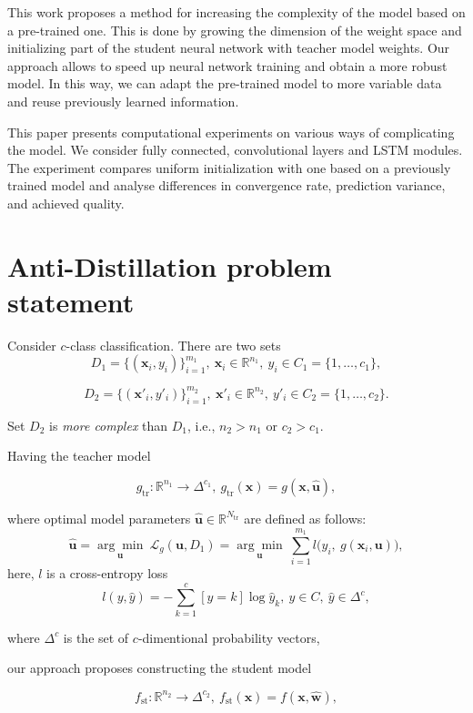 \documentclass[80pt]{article}
\begin{document}
This work proposes a method for increasing the complexity of the model based on a pre-trained one. This is done by growing the dimension of the weight space and initializing part of the student neural network with teacher model weights. Our approach allows to speed up neural network training and obtain a more robust model. In this way, we can adapt the pre-trained model to more variable data and reuse previously learned information.

This paper presents computational experiments on various ways of complicating the model. We consider fully connected, convolutional layers and LSTM modules. The experiment compares uniform initialization with one based on a previously trained model and analyse differences in convergence rate, prediction variance, and achieved quality.

\section{Anti-Distillation problem statement}
Consider $c$-class classification. There are two sets
$$D_1 = \{(\mathbf{x}_i, y_i)\}_{i=1}^{m_1},~\mathbf{x}_i \in \mathbb{R}^{n_1},~y_i \in C_1 = \{1, \dots, c_1\},$$

$$D_2 =  \{(\mathbf{x}'_i, y'_i)\}_{i=1}^{m_2},~\mathbf{x}'_i \in \mathbb{R}^{n_2},~y'_i \in C_2 = \{1, \dots, c_2\}.$$

Set $D_2$ is \textit{more complex} than $D_1$, i.e., $n_2 > n_1$ or $c_2 > c_1$.

Having the teacher model 

\[g_\text{tr}: \mathbb{R}^{n_1} \rightarrow \Delta^{c_1},~g_\text{tr}(\mathbf{x}) = g(\mathbf{x}, \hat{\mathbf{u}}),\] 

where optimal model parameters $\hat{\mathbf{u}} \in \mathbb{R}^{N_{\text{tr}}}$ are defined as follows:
$$\hat{\mathbf{u}} =  \underset{\mathbf{u}}{\arg\min}~\mathcal{L}_g(\mathbf{u}, D_1) =\underset{\mathbf{u}}{\arg\min}~\sum\limits_{i=1}^{m_1} l \bigl(y_i,~g(\mathbf{x}_i, \mathbf{u})\bigr),$$
here, $l$ is a cross-entropy loss 
$$l(y, \hat{y}) = -\sum\limits_{k=1}^{c} [y = k] \log{\hat{y}_k},~y \in C,~\hat{y} \in \Delta^c,$$

where $\Delta^c$ is the set of $c$-dimentional probability vectors,

our approach proposes constructing the student model

\[f_\text{st}: \mathbb{R}^{n_2} \rightarrow \Delta^{c_2},~f_\text{st}(\mathbf{x}) = f(\mathbf{x}, \hat{\mathbf{w}}),\]
\end{document}
